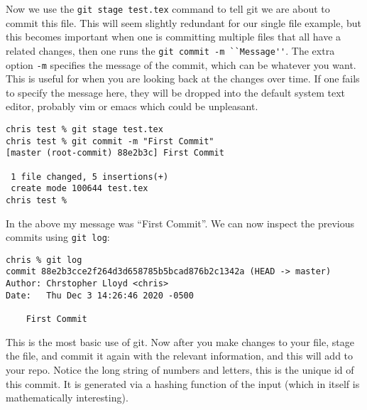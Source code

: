 \documentclass{article}
\begin{document}
Now we use the \lstinline{git stage test.tex} command to tell git we
are about to commit this file. This will seem slightly redundant for
our single file example, but this becomes important when one is
committing multiple files that all have a related changes, then one
runs the \lstinline{git commit -m ``Message''}. The extra option
\lstinline{-m} specifies the message of the commit, which can be
whatever you want. This is useful for when you are looking back at the
changes over time. If one fails to specify the message here, they will
be dropped into the default system text editor, probably vim or emacs
which could be unpleasant.
\begin{lstlisting}
chris test % git stage test.tex
chris test % git commit -m "First Commit"
[master (root-commit) 88e2b3c] First Commit

 1 file changed, 5 insertions(+)
 create mode 100644 test.tex
chris test % 
\end{lstlisting}
In the above my message was ``First Commit''. We can now inspect the
previous commits using \lstinline{git log}:


\begin{lstlisting}
chris % git log
commit 88e2b3cce2f264d3d658785b5bcad876b2c1342a (HEAD -> master)
Author: Chrstopher Lloyd <chris>
Date:   Thu Dec 3 14:26:46 2020 -0500

    First Commit

\end{lstlisting}
This is the most basic use of git. Now after you make changes to your
file, stage the file, and commit it again with the relevant
information, and this will add to your repo. Notice the long string of
numbers and letters, this is the unique id of this commit. It is
generated via a hashing function of the input (which in itself is
mathematically interesting).
\end{document}
